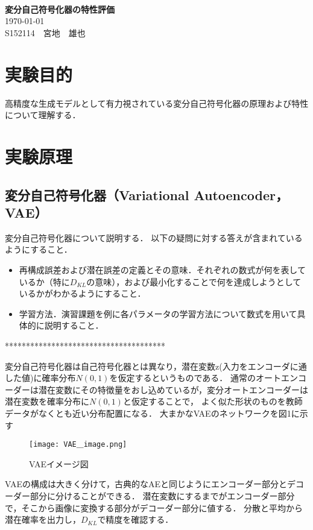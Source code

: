 \documentclass[12pt]{jsarticle}
\newcommand{\frontpage}[3]{%
\begin{center}
　\\
\vspace{15em}{\LARGE{}レポート課題}\\
　\\
{\Huge\bf#1}\\
\vspace{30em}
{\LARGE\today}\\
\vspace{2em}
{\LARGE#2　#3}
\end{center}
\thispagestyle{empty}
\clearpage
\setcounter{page}{1}
}
\begin{document}
\frontpage
{変分自己符号化器の特性評価}
{S152114}
{宮地　雄也}

\section{実験目的}

高精度な生成モデルとして有力視されている変分自己符号化器の原理および特性について理解する．

\section{実験原理}

\subsection{変分自己符号化器（Variational Autoencoder，VAE）}

変分自己符号化器について説明する．
以下の疑問に対する答えが含まれているようにすること．
\begin{itemize}
\item 再構成誤差および潜在誤差の定義とその意味．それぞれの数式が何を表しているか（特に$D_{KL}$の意味），および最小化することで何を達成しようとしているかがわかるようにすること．
\item 学習方法．演習課題を例に各パラメータの学習方法について数式を用いて具体的に説明すること．
\end{itemize}



**************************************


変分自己符号化器は自己符号化器とは異なり，潜在変数z(入力をエンコーダに通した値)に確率分布$N(0,1)$を仮定するというものである．
通常のオートエンコーダーは潜在変数にその特徴量をおし込めているが，変分オートエンコーダーは潜在変数を確率分布に$N(0,1)$と仮定することで，
よく似た形状のものを教師データがなくとも近い分布配置になる．
大まかなVAEのネットワークを図1に示す

\begin{figure}[ht]
  \begin{center}
    \texttt{[image: VAE＿image.png]}
    \caption{VAEイメージ図}
  \end{center}
\end{figure}

VAEの構成は大きく分けて，古典的なAEと同じようにエンコーダー部分とデコーダー部分に分けることができる．
潜在変数にするまでがエンコーダー部分で，そこから画像に変換する部分がデコーダー部分に値する．
分散と平均から潜在確率を出力し，$D_{KL}$で精度を確認する．
\end{document}
